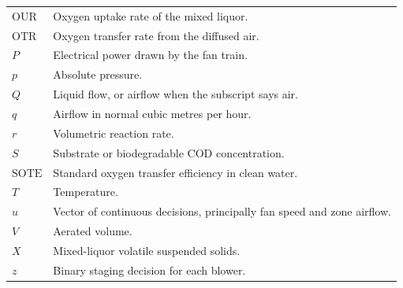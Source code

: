 \documentclass[12pt,a4paper]{report}
\begin{document}
{\begin{tabular}{@{}>{\raggedright\arraybackslash}p{2.5cm}p{11.4cm}@{}}
$\mathrm{OUR}$ & Oxygen uptake rate of the mixed liquor. \\
$\mathrm{OTR}$ & Oxygen transfer rate from the diffused air. \\
$P$ & Electrical power drawn by the fan train. \\
$p$ & Absolute pressure. \\
$Q$ & Liquid flow, or airflow when the subscript says air. \\
$q$ & Airflow in normal cubic metres per hour. \\
$r$ & Volumetric reaction rate. \\
$S$ & Substrate or biodegradable $\mathrm{COD}$ concentration. \\
$\mathrm{SOTE}$ & Standard oxygen transfer efficiency in clean water. \\
$T$ & Temperature. \\
$u$ & Vector of continuous decisions, principally fan speed and zone airflow. \\
$V$ & Aerated volume. \\
$X$ & Mixed-liquor volatile suspended solids. \\
$z$ & Binary staging decision for each blower. \\
\bottomrule
\end{tabular}
}








\nocite{*}
\printbibliography[heading=bibintoc,title={References}]
\end{document}

